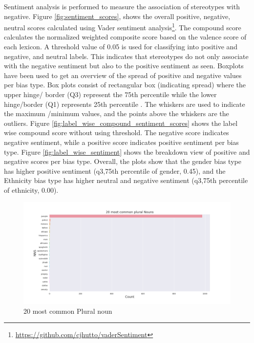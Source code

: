 Sentiment analysis is performed to measure the association of stereotypes with negative. Figure \ref{fig:sentiment_scores}, shows the overall positive, negative, neutral scores calculated using Vader sentiment analysis\footnote{\url{https://github.com/cjhutto/vaderSentiment}}. The compound score calculates the normalized weighted composite score based on the valence score of each lexicon. A threshold value of 0.05 is used for classifying into positive and negative, and neutral labels. This indicates that stereotypes do not only associate with the negative sentiment but also to the positive sentiment as seen. Boxplots have been used to get an overview of the spread of positive and negative values per bias type. Box plots consist of rectangular box (indicating spread) where the upper hinge/ border (Q3) represent the 75th percentile while the lower hinge/border (Q1) represents 25th percentile \cite{kurzl1988exploratory}. The whiskers are used to indicate the maximum /minimum values, and the points above the whiskers are the outliers. Figure \ref{fig:label_wise_compound_sentiment_scores} shows the label wise compound score without using threshold. The negative score indicates negative sentiment, while a positive score indicates positive sentiment per bias type. Figure \ref{fig:label_wise_sentiment} shows the breakdown view of positive and negative scores per bias type. Overall, the plots show that the gender bias type has higher positive sentiment (q3,75th percentile of gender, 0.45), and the Ethnicity bias type has higher neutral and negative sentiment (q3,75th percentile of ethnicity, 0.00).

\begin{figure}[h!]
    \centering
    \includegraphics[width=1\textwidth]{thesis/figures/20 most common plural Nouns.png}
    \caption{20 most common Plural noun}
    \label{fig:plural_nouns}
\end{figure}

